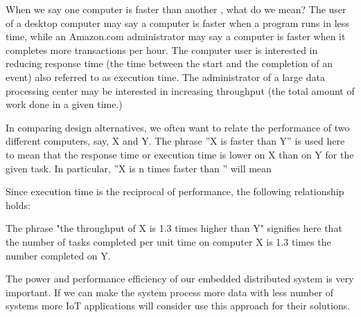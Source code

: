 \noindent
When we say one computer is faster than another , what do we mean? The user
of a desktop computer may say a computer is faster when a program runs in less
time, while an Amazon.com administrator may say a computer is faster when it
completes more transactions per hour. The computer user is interested in 
reducing response time (the time between the start and the completion of an 
event) also referred to as execution time. The administrator of a large data 
processing center may be interested in increasing throughput (the total amount 
of work done in a given time.) 

In comparing design alternatives, we often want to relate the performance of
two different computers, say, X and Y. The phrase ''X is faster than Y'' is
used here to mean that the response time or execution time is lower on X than
on Y for the given task. In particular, ''X is n times faster than ''  will
mean

Since execution time is the reciprocal of performance, the following
relationship holds:

The phrase "the throughput of X is 1.3 times higher than Y" signifies here that
the number of tasks completed per unit time on computer X is 1.3 times the
number completed on Y.

The power and performance efficiency of our embedded distributed system is very
important. If we can  make the system process more data with less number
of systems more IoT applications will consider use this approach for their
solutions.

\clearpage
